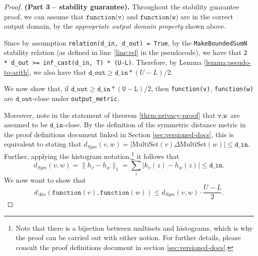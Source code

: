 \documentclass[11pt,a4paper]{article}
\theoremstyle{definition}
\newcommand{\MultiSet}{\mathrm{MultiSet}}
\newcommand{\din}{\texttt{d\_in}}
\newcommand{\dout}{\texttt{d\_out}}
\newcommand{\function}{\texttt{function}}
\begin{document}
    \begin{proof}
    \textbf{(Part 3 -- stability guarantee).} 
    Throughout the stability guarantee proof, we can assume that $\texttt{function(v)}$ and $\texttt{function(w)}$ are in the correct output domain, by the \textit{appropriate output domain property} shown above. 
    
    

    
    Since by assumption \texttt{relation(d\_in, d\_out) = True}, by the \texttt{MakeBoundedSumN} stability relation (as defined in line~\ref{line:rel} in the pseudocode), we have that \texttt{2 *  d\_out >= inf\_cast(d\_in, T) * (U-L)}. Therefore, by Lemma \ref{lemma:pseudo-to-arith}, we also have that $\dout \geq \din * (U-L)/2$.
    
    
    
    We now show that, if $\dout \geq \din * (\texttt{U}-\texttt{L})/2$, then \texttt{function(v)}, \texttt{function(w)} are $\dout$-close under \texttt{output\_metric}.

    
    
    Moreover, note in the statement of theorem \ref{thrm:privacy-proof} that $\texttt{v}, \texttt{w}$ are assumed to be $\din$-close. By the definition of the symmetric distance metric in the proof definitions document linked in Section \ref{sec:versioned-docs}, this is equivalent to stating that $d_{Sym}(v, w) = |\MultiSet(v) \Delta \MultiSet(w)| \leq \din$. Further, applying the histogram notation,\footnote{Note that there is a bijection between multisets and histograms, which is why the proof can be carried out with either notion. For further details, please consult the proof definitions document in section \ref{sec:versioned-docs}.} it follows that
    \[
        d_{Sym}(v, w) = \lVert h_{v} - h_{w}\rVert_1 = \sum_z |h_v(z) - h_w(z)| \leq \din.
    \]
    We now want to show that
    \[
        d_{Abs}(\function(v), \function(w)) \leq d_{Sym}(v, w) \cdot \dfrac{U-L}{2}.
    \]
    

\end{proof}
\end{document}
